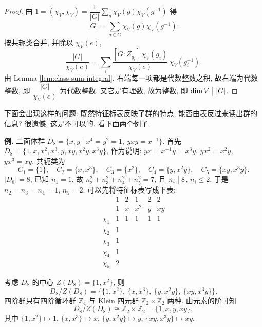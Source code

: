\begin{proof}
由 $1=(\chi_V,\chi_V)=\dfrac{1}{|G|}\sum_{g}\chi_V(g)\chi_V(g^{-1})$ 得
\[
  |G|=\sum_{g\in G}\chi_V(g)\chi_V(g^{-1}) .
\]
按共轭类合并, 并除以 $\chi_V(e)$,
\[
  \frac{|G|}{\chi_V(e)}
  =\sum_{i}\frac{[G:Z_{g_i}]\,\chi_V(g_i)}{\chi_V(e)}\,\chi_V(g_i^{-1}).
\]
由 Lemma \ref{lem:class-sum-integral}, 右端每一项都是代数整数之积, 故右端为代数整数,
即 $\dfrac{|G|}{\chi_V(e)}$ 为代数整数. 又它是有理数, 故为整数, 即 $\dim V\mathrel{\big|}|G|$.
\end{proof}

下面会出现这样的问题: 既然特征标表反映了群的特点, 能否由表反过来读出群的信息?
很遗憾, 这是不可以的. 看下面两个例子.

\noindent\textbf{例.} 二面体群
$D_8=\{x,y\mid x^4=y^2=1,\ yxy=x^{-1}\}$.
首先 $D_8=\{1,x,x^2,x^3,y,xy,x^2y,x^3y\}$, 作为说明:
$yx=x^{-1}y=x^3y$, $yx^2=x^2y$, $yx^3=xy$.
共轭类为
\[
  C_1=\{1\},\quad C_2=\{x,x^3\},\quad C_3=\{x^2\},\quad
  C_4=\{y,x^2y\},\quad C_5=\{xy,x^3y\}.
\]
$|D_8|=8$, 已知 $n_1=1$, 故 $n_2^2+n_3^2+n_4^2+n_5^2=7$, 且 $n_i\mathrel{\big|} 8$,
$n_i\le 2$, 于是 $n_2=n_3=n_4=1$, $n_5=2$. 可以先将特征标表写成下表:
\[
\begin{array}{c|ccccc}
  & 1 & 2 & 1 & 2 & 2\\
  & 1 & x & x^2 & y & xy\\ \hline
  \chi_1 & 1 & 1 & 1 & 1 & 1\\
  \chi_2 & 1 & & & & \\
  \chi_3 & 1 & & & & \\
  \chi_4 & 1 & & & & \\
  \chi_5 & 2 & & & &
\end{array}
\]

考虑 $D_8$ 的中心 $Z(D_8)=\{1,x^2\}$, 则
\[
  D_8/Z(D_8)=\bigl\{\{1,x^2\},\ \{x,x^3\},\ \{y,x^2y\},\ \{xy,x^3y\}\bigr\}.
\]
四阶群只有四阶循环群 $\mathbb{Z}_4$ 与 Klein 四元群 $\mathbb{Z}_2\times\mathbb{Z}_2$ 两种.
由元素的阶可知
\[
  D_8/Z(D_8)\cong\mathbb{Z}_2\times\mathbb{Z}_2=\{1,\bar x,\bar y,\bar x\bar y\},
\]
其中 $\{1,x^2\}\mapsto1$, $\{x,x^3\}\mapsto\bar x$, $\{y,x^2y\}\mapsto\bar y$,
$\{xy,x^3y\}\mapsto\bar x\bar y$.

